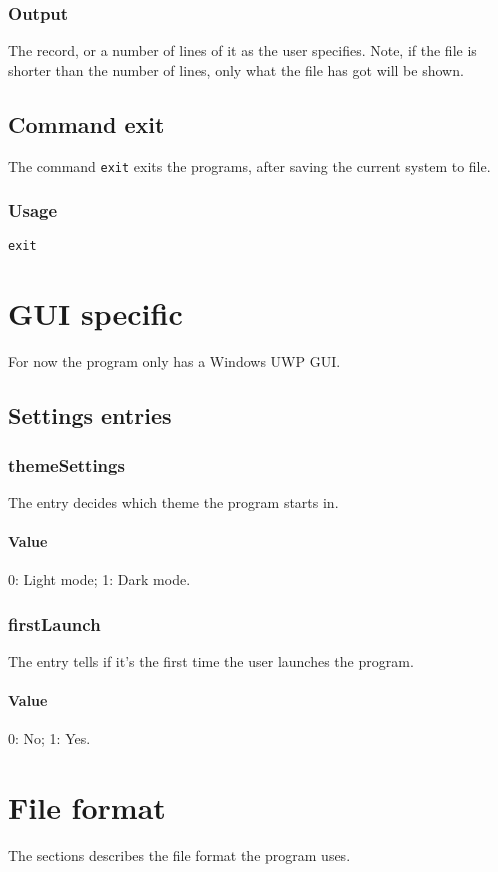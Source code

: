 \subsubsection{Output}
The record, or a number of lines of it as the user specifies. Note, if the file is shorter than the number of lines, only what the file has got will be shown.

\subsection{Command exit}
The command \texttt{exit} exits the programs, after saving the current system to file.

\subsubsection{Usage}
\begin{center}
	\texttt{exit}
\end{center}

\section{GUI specific}
For now the program only has a Windows UWP GUI.

\subsection{Settings entries}
\subsubsection{themeSettings}
The entry decides which theme the program starts in.

\paragraph{Value} 0: Light mode; 1: Dark mode.

\subsubsection{firstLaunch}
The entry tells if it's the first time the user launches the program.

\paragraph{Value} 0: No; 1: Yes.

\section{File format}
The sections describes the file format the program uses.

